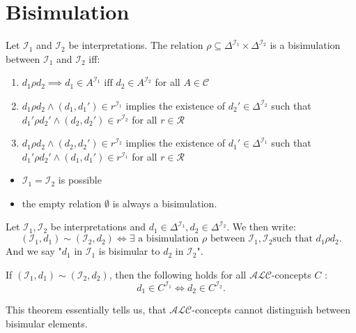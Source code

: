 \section{Bisimulation}
\begin{definition}[Bisimulation]\label{def:bisimulation}
	Let $\mathcal{I}_1$ and $\mathcal{I}_2$ be interpretations.
	The relation $\rho \subseteq \Delta^{\mathcal{I}_{1}} \times \Delta^{\mathcal{I}_2}$ is a bisimulation between $\mathcal{I}_1$ and $\mathcal{I}_2$ iff:
	\begin{enumerate}[label=(\roman*)]
		\item $d_1 \rho d_2 \implies d_1 \in A^{\mathcal{I}_1} \text{ iff } d_2 \in A^{\mathcal{I}_2}$ for all $A \in \mathscr{C}$
		\item $d_1 \rho d_2 \land  (d_1, d_1') \in r^{\mathcal{I}_1}$ implies the existence of $d_2' \in \Delta^{\mathcal{I}_2}$ such that
			$d_1' \rho d_2' \land (d_2, d_2') \in r^{\mathcal{I}_2}$ for all $r \in \mathscr{R}$
		\item $d_1 \rho d_2 \land  (d_2, d_2') \in r^{\mathcal{I}_2}$ implies the existence of $d_1' \in \Delta^{\mathcal{I}_1}$ such that
			$d_1' \rho d_2' \land (d_1, d_1') \in r^{\mathcal{I}_1}$ for all $r \in \mathscr{R}$
	\end{enumerate}
\end{definition}

\begin{note}
	\begin{itemize}
		\item $\mathcal{I}_1 = \mathcal{I}_2$ is possible
		\item the empty relation $\emptyset$ is always a bisimulation.
	\end{itemize}
\end{note}

\begin{notation}
	Let $\mathcal{I}_1, \mathcal{I}_2$ be interpretations and $d_1 \in \Delta^{\mathcal{I}_1}, d_2 \in \Delta^{\mathcal{I}_2}$.
	We then write:
	\[
		\left( \mathcal{I}_1, d_1 \right) \sim \left( \mathcal{I}_2, d_2 \right) \iff \exists \text{ a bisimulation $\rho$ between  $\mathcal{I}_1, \mathcal{I}_2$
		such that $d_1 \rho d_2$}
	.\]
	And we say "$d_1$ in $\mathcal{I}_1$ is bisimular to $d_2$ in $\mathcal{I}_2$".
\end{notation}

\begin{theorem}\label{thm: bisimulation invariance}
	If $ \left( \mathcal{I}_1,d_1 \right) \sim \left( \mathcal{I}_2, d_2 \right)$, then the following holds for all $\mathcal{ALC}$-concepts $C$ :
	\[
		d_1 \in C^{\mathcal{I}_1} \iff d_2 \in C^{\mathcal{I}_2}
	.\]
\end{theorem}
This theorem essentially tells us, that $\mathcal{ALC}$-concepts cannot distinguish between bisimular elements.
